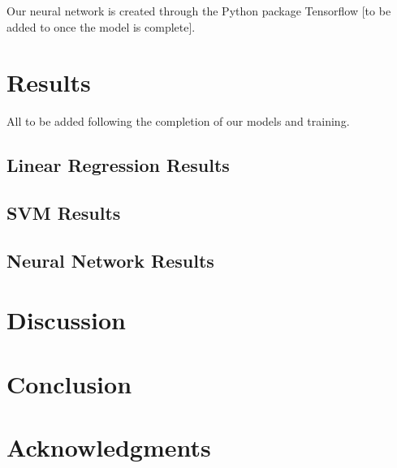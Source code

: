 \documentclass[11pt]{article}
\begin{document}
Our neural network is created through the Python package Tensorflow [to be added to once the model is complete].

\section{Results}
All to be added following the completion of our models and training.
\subsection{Linear Regression Results}


\subsection{SVM Results}


\subsection{Neural Network Results}


\section{Discussion}


\section{Conclusion}


\section*{Acknowledgments}







\end{document}
